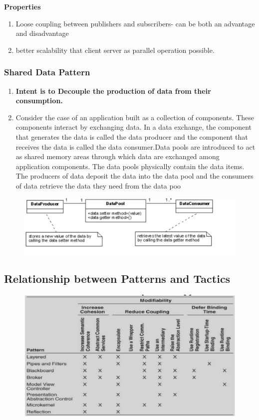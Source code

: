 \documentclass[a4paper]{article}
\begin{document}
\textbf{Properties}
\begin{enumerate}
\item Loose coupling between publishers and subscribers- can be both an advantage and disadvantage
\item better scalability that client server as parallel operation possible.
\end{enumerate}

\subsubsection{Shared Data Pattern}
\begin{enumerate}
\item \textbf{Intent is to Decouple the production of data from their consumption.}
\item Consider the case of an application built as a collection of components. These components interact by exchanging data. In a data exchange, the component that generates the data is called the data producer and the component that receives the data is called the data consumer.Data pools are introduced to act as shared memory areas through which data are exchanged among application components. The data pools physically contain the data items. The producers of data deposit the data into the data pool and the consumers of data retrieve the data they need from the data poo

\end{enumerate}


\begin{figure}[h]
\centering 
\includegraphics[scale=0.8]{images/shareddata.png}
\end{figure}

\subsection{Relationship between Patterns and Tactics}

\begin{figure}[H]
  \includegraphics[scale=0.5]{images/relationship.png}
\end{figure}
\end{document}
